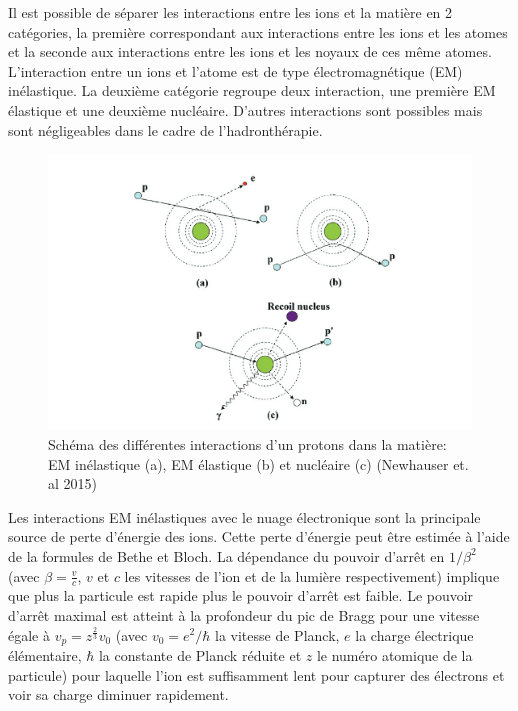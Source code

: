 \documentclass[11pt,a4paper,oldfontcommands]{memoir}
\begin{document}
Il est possible de séparer les interactions entre les ions et la matière en 2 catégories, la première correspondant aux interactions entre les ions et les atomes et la seconde aux interactions entre les ions et les noyaux de ces même atomes. L'interaction entre un ions et l'atome est de type électromagnétique (EM) inélastique. La deuxième catégorie regroupe deux interaction, une première EM élastique et une deuxième nucléaire. D'autres interactions sont possibles mais sont négligeables dans le cadre de l'hadronthérapie.\\
\begin{figure}[h!]
    \centering
    \includegraphics{intro/Newhauser2015.PNG}
    \caption{Schéma des différentes interactions d'un protons dans la matière: EM inélastique (a), EM élastique (b) et nucléaire (c) (Newhauser et. al 2015)}
    \label{fig:my_label}
\end{figure}

Les interactions EM inélastiques avec le nuage électronique sont la principale source de perte d'énergie des ions.  Cette perte d'énergie peut être estimée à l'aide de la formules de Bethe et Bloch. La dépendance du pouvoir d'arrêt en $1/\beta^2$ (avec $\beta = \frac{v}{c}$, $v$ et $c$ les vitesses de l'ion et de la lumière respectivement) implique que plus la particule est rapide plus le pouvoir d'arrêt est faible. Le pouvoir d'arrêt maximal est atteint à la profondeur du pic de Bragg pour une vitesse égale à $v_p = z^{\frac{2}{3}}v_0$ (avec $v_0 = e^2/\hbar$ la vitesse de Planck, $e$ la charge électrique élémentaire, $\hbar$ la constante de Planck réduite et $z$ le numéro atomique de la particule) pour laquelle l'ion est suffisamment lent pour capturer des électrons et voir sa charge diminuer rapidement. 
\end{document}
